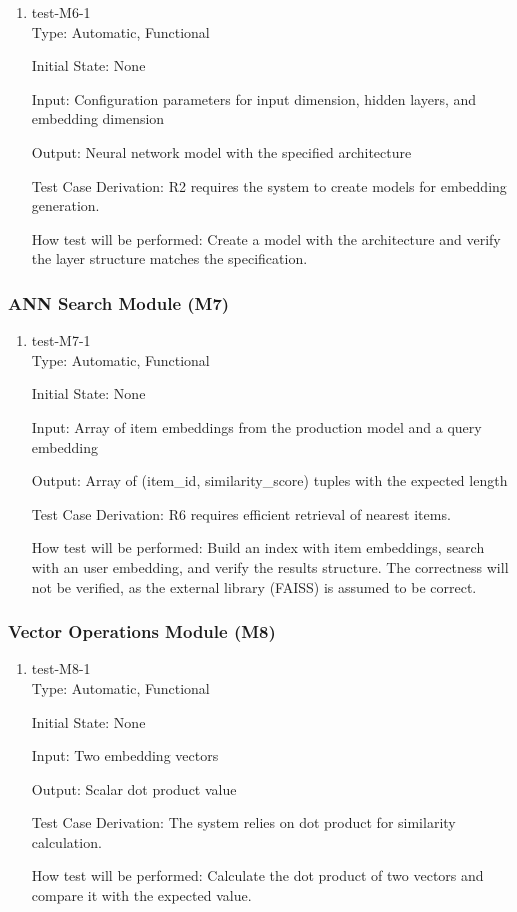 \documentclass[12pt, titlepage]{article}
\begin{document}
\begin{enumerate}

\item{test-M6-1\\}
Type: Automatic, Functional
					
Initial State: None
					
Input: Configuration parameters for input dimension, hidden layers, and embedding dimension
					
Output: Neural network model with the specified architecture

Test Case Derivation: R2 requires the system to create models for embedding generation.

How test will be performed: Create a model with the architecture and verify the layer structure matches the specification.

\end{enumerate}
\subsubsection{ANN Search Module (M7)}

\begin{enumerate}

\item{test-M7-1\\}
Type: Automatic, Functional
					
Initial State: None
					
Input: Array of item embeddings from the production model and a query embedding
					
Output: Array of (item\_id, similarity\_score) tuples with the expected length

Test Case Derivation: R6 requires efficient retrieval of nearest items.

How test will be performed: Build an index with item embeddings, search with an user embedding, and verify the results structure. The correctness will not be verified, as the external library (FAISS) is assumed to be correct.

\end{enumerate}

\subsubsection{Vector Operations Module (M8)}

\begin{enumerate}

\item{test-M8-1\\}
Type: Automatic, Functional
					
Initial State: None
					
Input: Two embedding vectors
					
Output: Scalar dot product value

Test Case Derivation: The system relies on dot product for similarity calculation.

How test will be performed: Calculate the dot product of two vectors and compare it with the expected value.

\end{enumerate}
\end{document}
